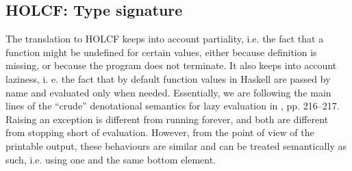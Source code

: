 \documentclass[a4paper,12pt]{article}
\begin{document}


\subsection{HOLCF: Type signature}

The translation to HOLCF keeps into account partiality, i.e. the fact
that a function might be undefined for certain values, either because
definition is missing, or because the program does not terminate.  It
also keeps into account laziness, i. e.  the fact that by default
function values in Haskell are passed by name and evaluated only when
needed.  Essentially, we are following the main lines of the ``crude''
denotational semantics for lazy evaluation in \cite{winskel}, pp.
216--217.  Raising an exception is different from running forever, and
both are different from stopping short of evaluation. However, from
the point of view of the printable output, these behaviours are
similar and can be treated semantically as such, i.e. using one and
the same bottom element.

\end{document}
